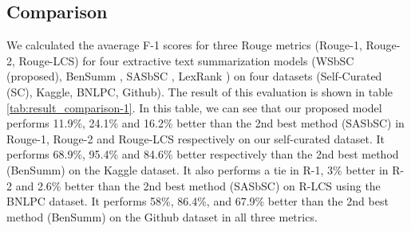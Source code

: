 \subsection{Comparison}\label{subsec:comparison}
We calculated the avaerage F-1 scores for three Rouge metrics (Rouge-1, Rouge-2, Rouge-LCS) for four extractive text summarization models (WSbSC (proposed), BenSumm \cite{chowdhury-etal-2021-tfidf-clustering}, SASbSC \cite{roychowdhury-etal-2022-spectral-base}, LexRank \cite{Erkan-lexRank-2004}) on four datasets (Self-Curated (SC), Kaggle, BNLPC, Github). The result of this evaluation is shown in table \ref{tab:result_comparison-1}. In this table, we can see that our proposed model performs  11.9\%, 24.1\% and 16.2\% better than the 2nd best method (SASbSC) in Rouge-1, Rouge-2 and Rouge-LCS respectively on our self-curated dataset. It performs 68.9\%, 95.4\% and 84.6\% better respectively than the 2nd best method (BenSumm) on the Kaggle dataset. It also performs a tie in R-1, 3\% better in R-2 and 2.6\% better than the 2nd best method (SASbSC) on R-LCS using the BNLPC dataset. It performs 58\%, 86.4\%, and 67.9\% better than the 2nd best method (BenSumm) on the Github dataset in all three metrics.\\


